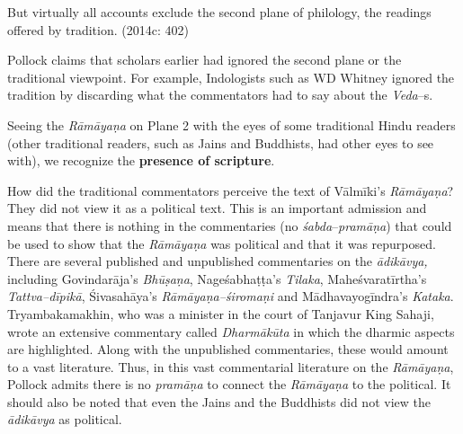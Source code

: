 \begin{myquote}
But virtually all accounts exclude the second plane of philology, the readings offered by tradition. (2014c: 402)
\end{myquote}

Pollock claims that scholars earlier had ignored the second plane or the traditional viewpoint. For example, Indologists such as WD Whitney ignored the tradition by discarding what the commentators had to say about the \textit{Veda}–s.

\begin{myquote}
Seeing the \textit{Rāmāyaṇa} on Plane 2 with the eyes of some traditional Hindu readers (other traditional readers, such as Jains and Buddhists, had other eyes to see with), we recognize the \textbf{presence of scripture}.
\end{myquote}

How did the traditional commentators perceive the text of Vālmīki’s \textit{Rāmāyaṇa}? They did not view it as a political text. This is an important admission and means that there is nothing in the commentaries (no\textit{ śabda}–\textit{pramāṇa}) that could be used to show that the \textit{Rāmāyaṇa }was political and that it was repurposed. There are several published and unpublished commentaries on the \textit{ādikāvya,} including Govindarāja’s \textit{Bhūṣaṇa}, Nageśabhaṭṭa’s \textit{Tilaka}, Maheśvaratīrtha’s \textit{Tattva–dīpikā}, Śivasahāya’s \textit{Rāmāyaṇa–śiromaṇi} and Mādhavayogīndra’s \textit{Kataka}. Tryambakamakhin, who was a minister in the court of Tanjavur King Sahaji, wrote an extensive commentary called \textit{Dharmākūta} in which the dharmic aspects are highlighted. Along with the unpublished commentaries, these would amount to a vast literature. Thus, in this vast commentarial literature on the \textit{Rāmāyaṇa}, Pollock admits there is no \textit{pramāṇa} to connect the \textit{Rāmāyaṇa }to the political. It should also be noted that even the Jains and the Buddhists did not view the\textit{ ādikāvya} as political.

